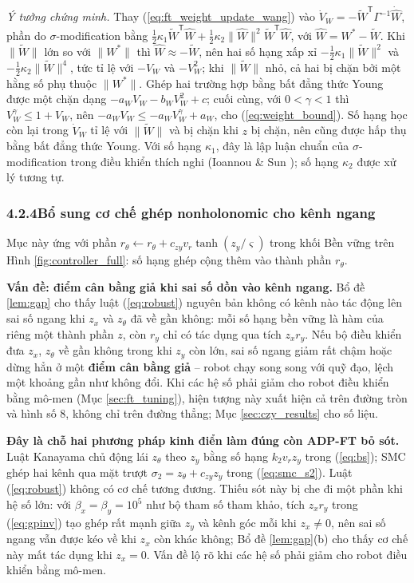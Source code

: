 \documentclass[12pt,a4paper]{article}
\makeatletter
\newcommand{\seclabel}[2]{\phantomsection\protected@edef\@currentlabel{#2}\label{#1}}
\newcommand{\T}{\mathsf{T}}
\makeatother
\begin{document}
\textit{Ý tưởng chứng minh.} Thay (\ref{eq:ft_weight_update_wang}) vào $\dot V_W = -\tilde W^\T\Gamma^{-1}\dot{\hat W}$, phần do $\sigma$-modification bằng $\frac12\kappa_1\tilde W^\T\hat W + \frac12\kappa_2\|\hat W\|^2\tilde W^\T\hat W$, với $\hat W = W^* - \tilde W$. Khi $\|\tilde W\|$ lớn so với $\|W^*\|$ thì $\hat W \approx -\tilde W$, nên hai số hạng xấp xỉ $-\frac12\kappa_1\|\tilde W\|^2$ và $-\frac12\kappa_2\|\tilde W\|^4$, tức tỉ lệ với $-V_W$ và $-V_W^2$; khi $\|\tilde W\|$ nhỏ, cả hai bị chặn bởi một hằng số phụ thuộc $\|W^*\|$. Ghép hai trường hợp bằng bất đẳng thức Young được một chặn dạng $-a_W V_W - b_W V_W^2 + c$; cuối cùng, với $0 < \gamma < 1$ thì $V_W^\gamma \leq 1 + V_W$, nên $-a_W V_W \leq -a_W V_W^\gamma + a_W$, cho (\ref{eq:weight_bound}). Số hạng học còn lại trong $\dot V_W$ tỉ lệ với $\|\tilde W\|$ và bị chặn khi $z$ bị chặn, nên cũng được hấp thụ bằng bất đẳng thức Young. Với số hạng $\kappa_1$, đây là lập luận chuẩn của $\sigma$-modification trong điều khiển thích nghi (Ioannou \& Sun \cite{Ioannou1996}); số hạng $\kappa_2$ được xử lý tương tự.

\subsubsection*{4.2.4\quad Bổ sung cơ chế ghép nonholonomic cho kênh ngang}
\seclabel{sec:czy}{4.2.4}

Mục này ứng với phần $r_\theta \leftarrow r_\theta + c_{zy} v_r\tanh(z_y/\varsigma)$ trong khối Bền vững trên Hình \ref{fig:controller_full}: số hạng ghép cộng thêm vào thành phần $r_\theta$.

\textbf{Vấn đề: điểm cân bằng giả khi sai số dồn vào kênh ngang.} Bổ đề \ref{lem:gap} cho thấy luật (\ref{eq:robust}) nguyên bản không có kênh nào tác động lên sai số ngang khi $z_x$ và $z_\theta$ đã về gần không: mỗi số hạng bền vững là hàm của riêng một thành phần $z$, còn $r_y$ chỉ có tác dụng qua tích $z_x r_y$. Nếu bộ điều khiển đưa $z_x$, $z_\theta$ về gần không trong khi $z_y$ còn lớn, sai số ngang giảm rất chậm hoặc dừng hẳn ở một \textbf{điểm cân bằng giả} -- robot chạy song song với quỹ đạo, lệch một khoảng gần như không đổi. Khi các hệ số phải giảm cho robot điều khiển bằng mô-men (Mục \ref{sec:ft_tuning}), hiện tượng này xuất hiện cả trên đường tròn và hình số 8, không chỉ trên đường thẳng; Mục \ref{sec:czy_results} cho số liệu.

\textbf{Đây là chỗ hai phương pháp kinh điển làm đúng còn ADP-FT bỏ sót.} Luật Kanayama chủ động lái $z_\theta$ theo $z_y$ bằng số hạng $k_2 v_r z_y$ trong (\ref{eq:bs}); SMC ghép hai kênh qua mặt trượt $\sigma_2 = z_\theta + c_{zy} z_y$ trong (\ref{eq:smc_s2}). Luật (\ref{eq:robust}) không có cơ chế tương đương. Thiếu sót này bị che đi một phần khi hệ số lớn: với $\beta_x = \beta_y = 10^5$ như bộ tham số tham khảo, tích $z_x r_y$ trong (\ref{eq:gpinv}) tạo ghép rất mạnh giữa $z_y$ và kênh góc mỗi khi $z_x \neq 0$, nên sai số ngang vẫn được kéo về khi $z_x$ còn khác không; Bổ đề \ref{lem:gap}(b) cho thấy cơ chế này mất tác dụng khi $z_x = 0$. Vấn đề lộ rõ khi các hệ số phải giảm cho robot điều khiển bằng mô-men.
\end{document}
